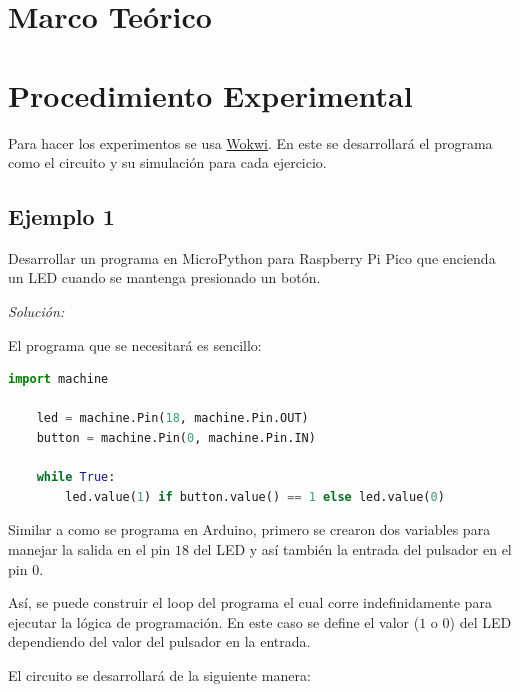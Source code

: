 \documentclass{article}
\begin{document}
    \section{Marco Teórico}\label{sec:marco-teórico}



    \section{Procedimiento Experimental}\label{sec:procedimiento-experimental}

    Para hacer los experimentos se usa \href{https://wokwi.com}{Wokwi}. En este se desarrollará el programa como el circuito y su simulación para cada ejercicio.

    \subsection{Ejemplo 1}

    Desarrollar un programa en MicroPython para Raspberry Pi Pico que encienda un LED cuando se mantenga presionado un botón.

    \bigbreak

    \textit{Solución:}

    \bigbreak

    El programa que se necesitará es sencillo:

    \begin{lstlisting}[language=Python, caption={Programa para el ejemplo 1}]
    import machine

    led = machine.Pin(18, machine.Pin.OUT)
    button = machine.Pin(0, machine.Pin.IN)

    while True:
        led.value(1) if button.value() == 1 else led.value(0)
    \end{lstlisting}

    Similar a como se programa en Arduino, primero se crearon dos variables para manejar la salida en el pin $18$ del LED y así también la entrada del pulsador en el pin $0$.

    \bigbreak

    Así, se puede construir el loop del programa el cual corre indefinidamente para ejecutar la lógica de programación. En este caso se define el valor ($1$ o $0$) del LED dependiendo del valor del pulsador en la entrada.

    \bigbreak

    El circuito se desarrollará de la siguiente manera:
\end{document}
